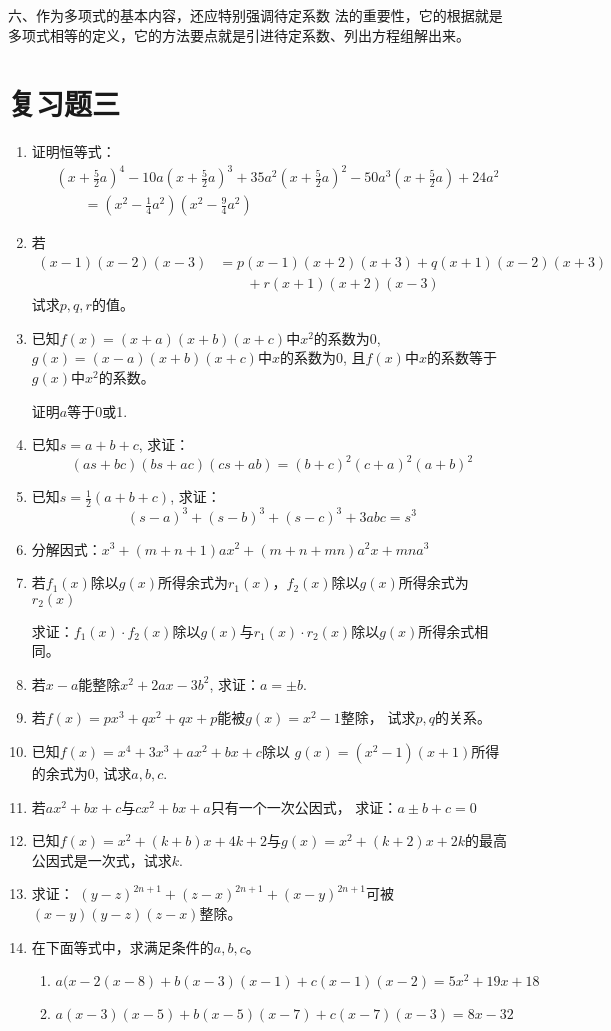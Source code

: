 六、作为多项式的基本内容，还应特别强调待定系数
法的重要性，它的根据就是多项式相等的定义，它的方法要点就是引进待定系数、列出方程组解出来。



\section*{复习题三}
\begin{enumerate}
\item 证明恒等式：
\[\begin{split}
   & \left(x+\frac{5}{2}a\right)^4-10a\left(x+\frac{5}{2}a\right)^3+35a^2\left(x+\frac{5}{2}a\right)^2-50a^3\left(x+\frac{5}{2}a\right)+24a^2\\
&\qquad = \left(x^2-\frac{1}{4}a^2\right)\left(x^2-\frac{9}{4}a^2\right)
\end{split}\]
\item 若
\[\begin{split}
    (x-1)(x-2)(x-3)&=p(x-1) (x+2)(x+3)+q(x+1)(x-2)(x+3)\\
    &\qquad  +r (x+1) (x+2)(x-3)
\end{split}\]
试求$p,q,r$的值。
\item 已知$f(x)=(x+a)(x+b)(x+c)$中$x^2$的系数为0, 
$g(x)=(x-a)(x+b)(x+c)$中$x$的系数为0, 且$f(x)$中$x$的系数等于$g(x)$中$x^2$的系数。

证明$a$等于0或1.
\item 已知$s=a+b+c$, 求证：
\[(as+bc) (bs+ac)(cs+ab)=(b+c)^2(c+a)^2(a+b)^2\]

\item 已知$s=\frac{1}{2}(a+b+c)$, 求证：
\[(s-a)^3+ (s-b)^3+ (s-c)^3+3abc=s^3\]
\item 分解因式：$x^3+ (m+n+1) ax^2+ (m+n+mn) a^2x+mna^3$
\item 若$f_1(x)$除以$g(x)$所得余式为$r_1(x)$，$f_2(x)$除以$g(x)$所得余式为$r_2(x)$

求证：$f_1(x)\cdot f_2(x)$除以$g(x)$与$r_1(x)\cdot r_2(x)$除以$g(x)$所得余式相同。

\item  若$x-a$能整除$x^2+2ax-3b^2$, 求证：$a=\pm b$.

\item  若$f(x)=px^3+qx^2+qx+p$能被$g(x)=x^2-1$整除，
试求$p,q$的关系。
\item  已知$f(x)=x^4+3x^3+ax^2+bx+c$除以
$g(x)=(x^2-1)(x+1)$所得的余式为0, 试求$a,b,c$.
\item  若$ax^2+bx+c$与$cx^2+bx+a$只有一个一次公因式，
求证：$a\pm b+c=0$
\item 已知$f(x)=x^2+(k+b)x+4k+2$与$g(x)=x^2+(k+2)x+2k$的最高公因式是一次式，试求$k$.
\item  求证：
$(y-z)^{2n+1}+(z-x)^{2n+1}+(x-y)^{2n+1}$可被$(x-y)(y-z)(z-x)$整除。
\item  在下面等式中，求满足条件的$a,b,c$。
\begin{enumerate}
    \item $a (x-2 (x-8) +b (x-3) (x-1)+c (x-1) (x-2)=5x^2+19x+18$
    \item $a (x-3) (x-5)+b(x-5)(x-7)+c (x-7) (x-3)=8x-32$
\end{enumerate}


\end{enumerate}

